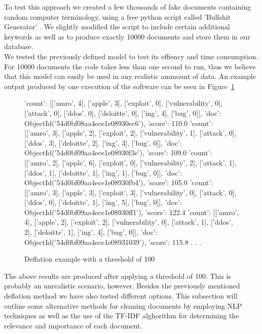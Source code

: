 \documentclass[12pt]{article}
\newcounter{subsubsubsection}[subsubsection]
\begin{document}
To test this approach we created a few thousands of fake documents containing random computer terminology, using a free python script called 'Bullshit Generator' \cite{bullgen}. We slightly modified the script to include certain additional keywords as well as to produce exactly 10000 documents and store them in our database. 
\hfill \break\\
We tested the previously defined model to test its effiency and time consumption. For 10000 documents the code takes less than one second to run, thus we believe that this model can easily be used in any realistic ammount of data. An example output produced by one execution of the software can be seen in Figure~\ref{fig:deflate}

\begin{figure}[t]
\begin{footnotesize}
\begin{spverbatim}

{'count': [['amro', 4], ['apple', 3], ['exploit', 0], ['vulnerability', 0], ['attack', 0], ['ddos', 0], ['deloitte', 0], ['ing', 4], ['bug', 0]], 'doc': ObjectId('54d0bf08aa4ece1e08930ec6'), 'score': 110.0}
{'count': [['amro', 3], ['apple', 2], ['exploit', 2], ['vulnerability', 1], ['attack', 0], ['ddos', 3], ['deloitte', 2], ['ing', 3], ['bug', 0]], 'doc': ObjectId('54d0bf09aa4ece1e08930f3e'), 'score': 109.0}
{'count': [['amro', 2], ['apple', 6], ['exploit', 0], ['vulnerability', 2], ['attack', 1], ['ddos', 1], ['deloitte', 1], ['ing', 1], ['bug', 0]], 'doc': ObjectId('54d0bf09aa4ece1e08930fb4'), 'score': 105.0}
{'count': [['amro', 3], ['apple', 3], ['exploit', 3], ['vulnerability', 0], ['attack', 0], ['ddos', 0], ['deloitte', 1], ['ing', 5], ['bug', 0]], 'doc': ObjectId('54d0bf09aa4ece1e08930ff1'), 'score': 122.4}
{'count': [['amro', 4], ['apple', 2], ['exploit', 2], ['vulnerability', 0], ['attack', 1], ['ddos', 2], ['deloitte', 1], ['ing', 4], ['bug', 0]], 'doc': ObjectId('54d0bf09aa4ece1e08931039'), 'score': 115.8}
.
.
.
\end{spverbatim}
\end{footnotesize}
\captionsetup{font=small}
\caption{Deflation example with a threshold of 100}
\label{fig:deflate}
\end{figure}
\newpage 
\hfill \break
The above results are produced after applying a threshold of 100. This is probably an unrealistic scenario, however.
Besides the previously mentioned deflation method we have also tested different options. This subsection will outline some alternative methods for cleaning documents by employing NLP techniques as well as the use of the TF-IDF alghorithm for determining the relevance and importance of each document.
\end{document}
